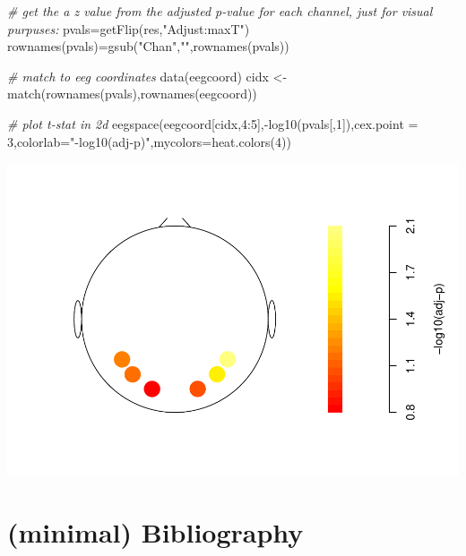 \documentclass[
]{article}
\newenvironment{Shaded}{\begin{snugshade}}{\end{snugshade}}
\newcommand{\AttributeTok}[1]{\textcolor[rgb]{0.77,0.63,0.00}{#1}}
\newcommand{\CommentTok}[1]{\textcolor[rgb]{0.56,0.35,0.01}{\textit{#1}}}
\newcommand{\DecValTok}[1]{\textcolor[rgb]{0.00,0.00,0.81}{#1}}
\newcommand{\FunctionTok}[1]{\textcolor[rgb]{0.00,0.00,0.00}{#1}}
\newcommand{\NormalTok}[1]{#1}
\newcommand{\OtherTok}[1]{\textcolor[rgb]{0.56,0.35,0.01}{#1}}
\newcommand{\SpecialCharTok}[1]{\textcolor[rgb]{0.00,0.00,0.00}{#1}}
\newcommand{\StringTok}[1]{\textcolor[rgb]{0.31,0.60,0.02}{#1}}
\begin{document}
\begin{Shaded}
\begin{Highlighting}[]
\CommentTok{\# get the a z value from the adjusted p{-}value for each channel, just for visual purpuses:}
\NormalTok{pvals}\OtherTok{=}\FunctionTok{getFlip}\NormalTok{(res,}\StringTok{"Adjust:maxT"}\NormalTok{)}
\FunctionTok{rownames}\NormalTok{(pvals)}\OtherTok{=}\FunctionTok{gsub}\NormalTok{(}\StringTok{"Chan"}\NormalTok{,}\StringTok{""}\NormalTok{,}\FunctionTok{rownames}\NormalTok{(pvals))}

\CommentTok{\# match to eeg coordinates}
\FunctionTok{data}\NormalTok{(eegcoord)}
\NormalTok{cidx }\OtherTok{\textless{}{-}} \FunctionTok{match}\NormalTok{(}\FunctionTok{rownames}\NormalTok{(pvals),}\FunctionTok{rownames}\NormalTok{(eegcoord))}

\CommentTok{\# plot t{-}stat in 2d}
\FunctionTok{eegspace}\NormalTok{(eegcoord[cidx,}\DecValTok{4}\SpecialCharTok{:}\DecValTok{5}\NormalTok{],}\SpecialCharTok{{-}}\FunctionTok{log10}\NormalTok{(pvals[,}\DecValTok{1}\NormalTok{]),}\AttributeTok{cex.point =} \DecValTok{3}\NormalTok{,}\AttributeTok{colorlab=}\StringTok{"{-}log10(adj{-}p)"}\NormalTok{,}\AttributeTok{mycolors=}\FunctionTok{heat.colors}\NormalTok{(}\DecValTok{4}\NormalTok{))}
\end{Highlighting}
\end{Shaded}

\includegraphics{perm_repeated_measures_files/figure-latex/unnamed-chunk-16-1.pdf}

\hypertarget{minimal-bibliography}{%
\section{(minimal) Bibliography}\label{minimal-bibliography}}
\end{document}
